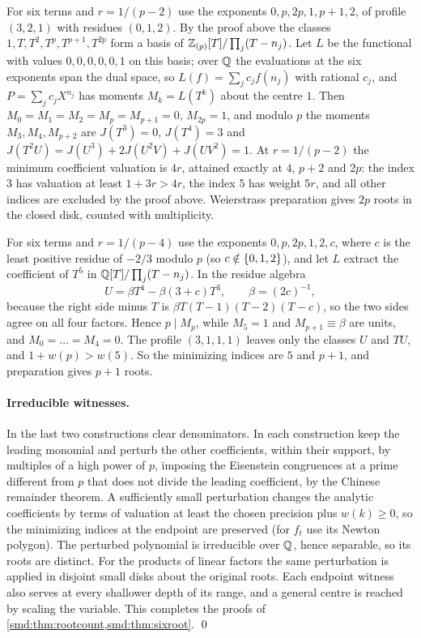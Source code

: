 For six terms and $r=1/(p-2)$ use the exponents $0,p,2p,1,p+1,2$, of profile $(3,2,1)$ with
residues $(0,1,2)$. By the proof above the classes $1,T,T^2,T^p,T^{p+1},T^{2p}$ form a basis
of $\mathbb{Z}_{(p)}[T]/\prod_j(T-n_j)$. Let $L$ be the functional with values $0,0,0,0,0,1$ on this
basis; over $\mathbb{Q}$ the evaluations at the six exponents span the dual space, so
$L(f)=\sum_jc_jf(n_j)$ with rational $c_j$, and $P=\sum_jc_jX^{n_j}$ has moments $M_k=L(T^k)$
about the centre $1$. Then $M_0=M_1=M_2=M_p=M_{p+1}=0$, $M_{2p}=1$, and modulo $p$ the
moments $M_3,M_4,M_{p+2}$ are $J(T^3)=0$, $J(T^4)=3$ and
$J(T^2U)=J(U^3)+2J(U^2V)+J(UV^2)=1$. At $r=1/(p-2)$ the minimum coefficient valuation is
$4r$, attained exactly at $4$, $p+2$ and $2p$: the index $3$ has valuation at least
$1+3r>4r$, the index $5$ has weight $5r$, and all other indices are excluded by the proof
above. Weierstrass preparation gives $2p$ roots in the closed disk, counted with
multiplicity.

For six terms and $r=1/(p-4)$ use the exponents $0,p,2p,1,2,c$, where $c$ is the least
positive residue of $-2/3$ modulo $p$ (so $c\notin\{0,1,2\}$), and let $L$ extract the
coefficient of $T^5$ in $\mathbb{Q}[T]/\prod_j(T-n_j)$. In the residue algebra
\[
 U=\beta T^4-\beta(3+c)T^3,\qquad \beta=(2c)^{-1},
\]
because the right side minus $T$ is $\beta T(T-1)(T-2)(T-c)$, so the two sides agree on all
four factors. Hence $p\mid M_p$, while $M_5=1$ and $M_{p+1}\equiv\beta$ are units, and
$M_0=\dots=M_4=0$. The profile $(3,1,1,1)$ leaves only the classes $U$ and $TU$, and
$1+w(p)>w(5)$. So the minimizing indices are $5$ and $p+1$, and preparation gives $p+1$
roots.

\paragraph{Irreducible witnesses.}
In the last two constructions clear denominators. In each construction keep the leading
monomial and perturb the other coefficients, within their support, by multiples of a high
power of $p$, imposing the Eisenstein congruences at a prime different from $p$ that does not
divide the leading coefficient, by the Chinese remainder theorem. A sufficiently small
perturbation changes the analytic coefficients by terms of valuation at least the chosen
precision plus $w(k)\ge0$, so the minimizing indices at the endpoint are preserved (for
$f_t$ use its Newton polygon). The perturbed polynomial is irreducible over $\mathbb{Q}$, hence
separable, so its roots are distinct. For the products of linear factors the same
perturbation is applied in disjoint small disks about the original roots. Each endpoint
witness also serves at every shallower depth of its range, and a general centre is reached by
scaling the variable. This completes the proofs of \cref{smd:thm:rootcount,smd:thm:sixroot}.
\qed

